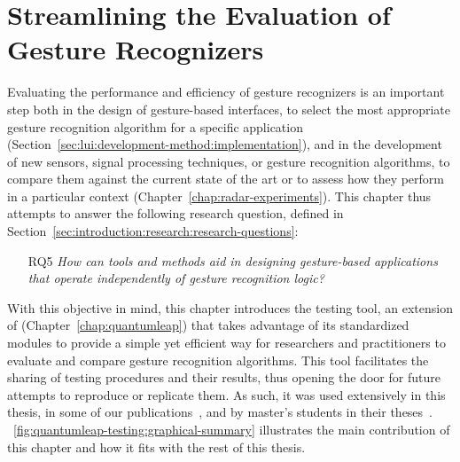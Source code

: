 \chapter{Streamlining the Evaluation of Gesture Recognizers} \label{chap:quantumleap-testing}

Evaluating the performance and efficiency of gesture recognizers is an important step both in the design of gesture-based interfaces, to select the most appropriate gesture recognition algorithm for a specific application (Section~\ref{sec:lui:development-method:implementation}), and in the development of new sensors, signal processing techniques, or gesture recognition algorithms, to compare them against the current state of the art or to assess how they perform in a particular context (Chapter~\ref{chap:radar-experiments}). This chapter thus attempts to answer the following research question, defined in Section~\ref{sec:introduction:research:research-questions}:
%
\begin{itemize}
  \item [RQ5] \textit{How can tools and methods aid in designing gesture-based applications that operate independently of gesture recognition logic?}
\end{itemize}
%
With this objective in mind, this chapter introduces the \ql testing tool, an extension of \ql (Chapter~\ref{chap:quantumleap}) that takes advantage of its standardized modules to provide a simple yet efficient way for researchers and practitioners to evaluate and compare gesture recognition algorithms. This tool facilitates the sharing of testing procedures and their results, thus opening the door for future attempts to reproduce or replicate them.
%
As such, it was used extensively in this thesis, in some of our publications~\cite{Sluyters:2022:LUI,Sluyters:2022:IUI,Sluyters:2023}, and by master's students in their theses~\cite{Neuville:2021,Steeman:2022,Lahousse:2022,Cornet:2023,Giot:2023}. \fig~\ref{fig:quantumleap-testing:graphical-summary} illustrates the main contribution of this chapter and how it fits with the rest of this thesis.

